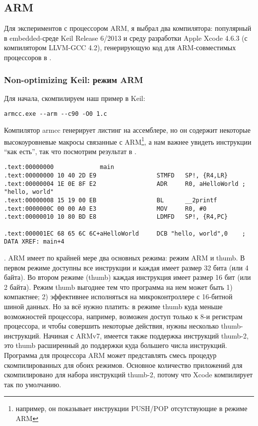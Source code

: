 ﻿\subsection{ARM}

Для экспериментов с процессором ARM, я выбрал два компилятора: популярный в embedded-среде Keil Release 6/2013 и среду разработки Apple Xcode 4.6.3 (с компилятором LLVM-GCC 4.2), генерирующую код для ARM-совместимых процессоров в \idevices.

\subsubsection{Non-optimizing Keil: режим ARM}

Для начала, скомпилируем наш пример в Keil:

\begin{lstlisting}
armcc.exe --arm --c90 -O0 1.c 
\end{lstlisting}

Компилятор armcc генерирует листинг на ассемблере, но он содержит некоторые высокоуровневые макросы связанные с ARM\footnote{например, он показывает инструкции PUSH/POP отсутствующие в режиме ARM},
а нам важнее увидеть инструкции ``как есть'', так что посмотрим результат в \IDA.

\begin{lstlisting}
.text:00000000             main
.text:00000000 10 40 2D E9                 STMFD   SP!, {R4,LR}
.text:00000004 1E 0E 8F E2                 ADR     R0, aHelloWorld ; "hello, world"
.text:00000008 15 19 00 EB                 BL      __2printf
.text:0000000C 00 00 A0 E3                 MOV     R0, #0
.text:00000010 10 80 BD E8                 LDMFD   SP!, {R4,PC}

.text:000001EC 68 65 6C 6C+aHelloWorld     DCB "hello, world",0    ; DATA XREF: main+4
\end{lstlisting}

.
ARM имеет по крайней мере два основных режима: режим ARM и thumb. 
В первом режиме доступны все инструкции и каждая имеет размер 32 бита (или 4 байта). 
Во втором режиме (thumb) каждая инструкция имеет размер 16 бит (или 2 байта). Режим thumb выгоднее тем что программа
на нем может быть 1) компактнее; 2) эффективнее исполняться на микроконтроллере с 16-битной шиной данных. Но за всё
нужно платить: в режиме thumb куда меньше возможностей процессора, например, возможен доступ только к 8-и регистрам
процессора, и чтобы совершить некоторые действия, нужны несколько thumb-инструкций.
Начиная с ARMv7, имеется также поддержка инструкций thumb-2, это thumb расширенный до поддержки куда большего числа инструкций.
Программа для процессора ARM может представлять смесь процедур скомпилированных для обоих режимов.
Основное количество приложений для \idevices скомпилировано для набора инструкций thumb-2, потому что Xcode
компилирует так по умолчанию.

